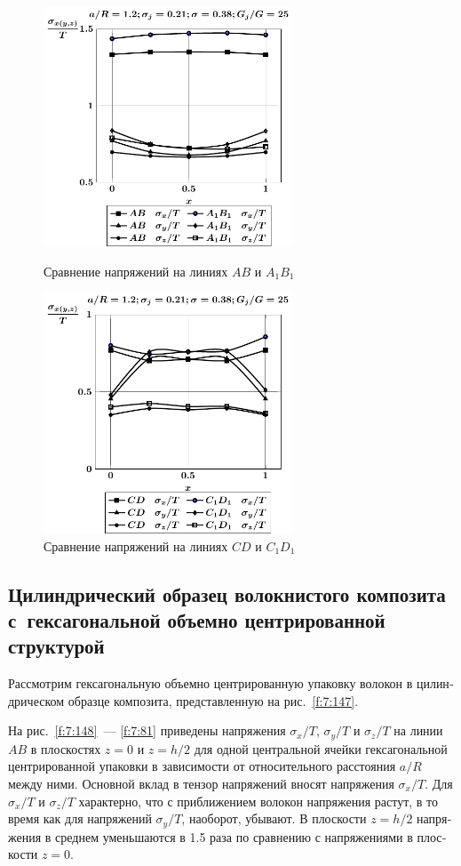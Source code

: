\begin{russian}
\begin{figure}[h!]
\centering\footnotesize
\parbox[b]{7.5cm}{\centering\includegraphics[width=7.4cm]{inc24-(ab-a1b1)-a12-h10-r10-g25-z0.pdf}
\caption{Сравнение напряжений на линиях $AB$ и $A_1B_1$
\label{f:7:118}}}\hfil\hfil
\parbox[b]{7.5cm}{\centering\includegraphics[width=7.4cm]{inc24-(cd-c1d1)-a12-h10-r10-g25-z0.pdf}
\caption{Сравнение напряжений на линиях $CD$ и $C_1D_1$
\label{f:7:119}}}
\end{figure}


\subsection{Цилиндрический образец волокнистого композита с~гексагональной объемно центрированной структурой}

Рассмотрим гексагональную объемно центрированную упаковку волокон  в цилиндрическом образце композита, представленную на рис.~\ref{f:7:147}.

На рис.~\ref{f:7:148}~--- \ref{f:7:81} приведены напряжения $\sigma_x/T$, $\sigma_y/T$ и $\sigma_z/T$ на линии $AB$ в плоскостях $z=0$ и $z=h/2$ для одной центральной ячейки гексагональной центрированной упаковки в зависимости от относительного расстояния $a/R$ между ними. Основной вклад в тензор напряжений вносят напряжения $\sigma_x/T$. Для $\sigma_x/T$ и $\sigma_z/T$ характерно, что с приближением волокон напряжения растут, в то время как для напряжений $\sigma_y/T$, наоборот, убывают. В плоскости $z=h/2$ напряжения в среднем уменьшаются в 1.5 раза по сравнению с напряжениями в плоскости $z=0$.


\end{russian}
